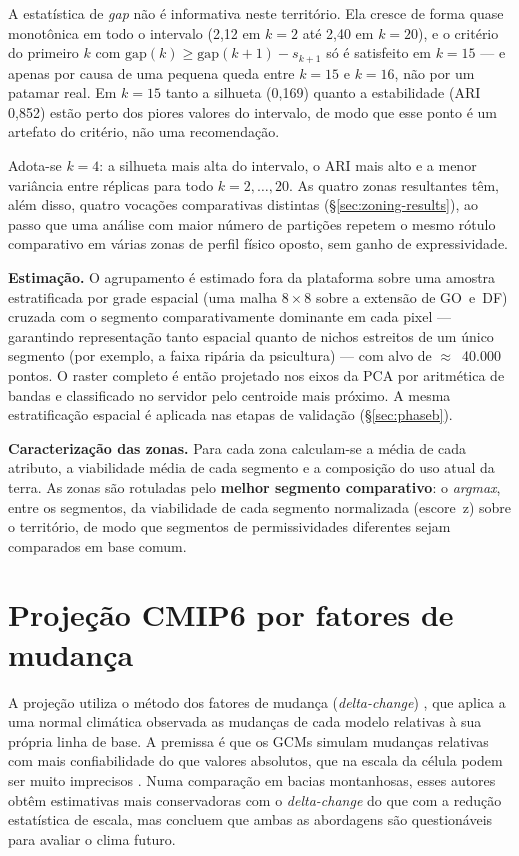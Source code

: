 A estatística de \emph{gap} não é informativa neste território. Ela cresce de forma quase
monotônica em todo o intervalo (2,12 em $k=2$ até 2,40 em $k=20$), e o critério do primeiro $k$
com $\mathrm{gap}(k) \geq \mathrm{gap}(k+1) - s_{k+1}$ só é satisfeito em $k=15$ --- e apenas
por causa de uma pequena queda entre $k=15$ e $k=16$, não por um patamar real. Em $k=15$ tanto a
silhueta (0,169) quanto a estabilidade (ARI 0,852) estão perto dos piores valores do intervalo,
de modo que esse ponto é um artefato do critério, não uma recomendação.

Adota-se $k = 4$: a silhueta mais alta do intervalo, o ARI mais alto e a menor variância entre
réplicas para todo $k = 2,\dots,20$. As quatro zonas resultantes têm, além disso, quatro vocações
comparativas distintas (\S\ref{sec:zoning-results}), ao passo que uma análise com maior número de partições
repetem o mesmo rótulo comparativo em várias zonas de perfil físico oposto, sem ganho de expressividade.

\textbf{Estimação.} O agrupamento é estimado fora da plataforma sobre uma amostra estratificada por
grade espacial (uma malha $8\times8$ sobre a extensão de GO~e~DF) cruzada com o segmento
comparativamente dominante em cada pixel --- garantindo representação tanto espacial quanto de
nichos estreitos de um único segmento (por exemplo, a faixa ripária da psicultura) --- com alvo de
$\approx$~40.000 pontos. O raster completo é então projetado nos eixos da PCA por 
aritmética de bandas e classificado no servidor pelo centroide mais próximo. 
A mesma estratificação espacial é aplicada nas etapas de validação (\S\ref{sec:phaseb}).

\textbf{Caracterização das zonas.} Para cada zona calculam-se a média de cada atributo, a viabilidade
média de cada segmento e a composição do uso atual da terra. As zonas são rotuladas pelo
\textbf{melhor segmento comparativo}: o \emph{argmax}, entre os segmentos, da viabilidade de cada
segmento normalizada (escore~z) sobre o território, de modo que segmentos de permissividades
diferentes sejam comparados em base comum.

\section{Projeção CMIP6 por fatores de mudança}\label{sec:cmip6}

A projeção utiliza o método dos fatores de mudança (\emph{delta-change})
\citep[p.~3]{ramirez-villegas_downscaling_2010}, que aplica a uma normal climática observada as
mudanças de cada modelo relativas à sua própria linha de base.
A premissa é que os GCMs simulam mudanças relativas com mais confiabilidade do que valores absolutos,
que na escala da célula podem ser muito imprecisos \citep[pp.~387, 396]{hay_comparison_2000}. Numa
comparação em bacias montanhosas, esses autores obtêm estimativas mais conservadoras com o
\emph{delta-change} do que com a redução estatística de escala, mas concluem que ambas as abordagens
são questionáveis para avaliar o clima futuro.

